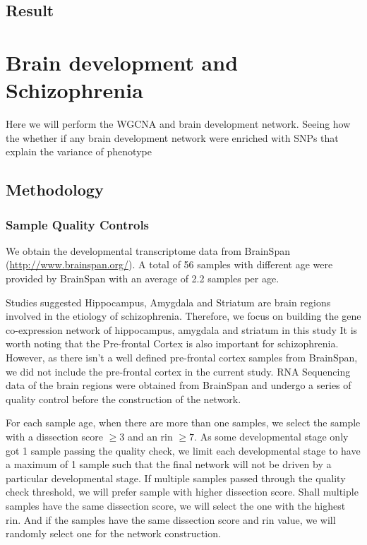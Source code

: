 \documentclass{book}
\begin{document}
	\subsection{Result}
	\section{Brain development and Schizophrenia}
	Here we will perform the WGCNA and brain development network.
	Seeing how the whether if any brain development network were enriched with SNPs that explain the variance of phenotype
	\subsection{Methodology}
	\subsubsection{Sample Quality Controls}
	We obtain the developmental transcriptome data from BrainSpan (\url{http://www.brainspan.org/}). 
	A total of 56 samples with different age were provided by BrainSpan with an average of 2.2 samples per age.
	
	Studies suggested Hippocampus\citep{Velakoulis2006,Nugent2007}, Amygdala and Striatum\citep{Simpson2010} are brain regions involved in the etiology of schizophrenia. 
	Therefore, we focus on building the gene co-expression network of hippocampus, amygdala and striatum in this study
	It is worth noting that the Pre-frontal Cortex is also important for schizophrenia. 
	However, as there isn't a well defined pre-frontal cortex samples from BrainSpan, we did not include the pre-frontal cortex in the current study.
	RNA Sequencing data of the brain regions were obtained from BrainSpan and undergo a series of quality control before the construction of the network. 
	 
	For each sample age, when there are more than one samples, we select the sample with a dissection score $\ge3$ and an \gls{rin} $\ge7$. 
	As some developmental stage only got 1 sample passing the quality check, we limit each developmental stage to have a maximum of 1 sample such that the final network will not be driven by a particular developmental stage. 
	If multiple samples passed through the quality check threshold, we will prefer sample with higher dissection score. 
	Shall multiple samples have the same dissection score, we will select the one with the highest \gls{rin}. 
	And if the samples have the same dissection score and \gls{rin} value, we will randomly select one for the network construction.
	
\end{document}
